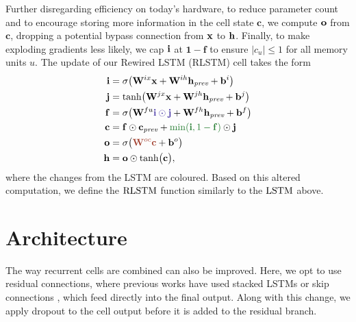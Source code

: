 Further disregarding efficiency on today's hardware, to reduce parameter count and to encourage storing more information in the cell state $\mathbf{c}$, we compute $\mathbf{o}$ from $\mathbf{c}$, dropping a potential bypass connection from $\mathbf{x}$ to $\mathbf{h}$.
Finally, to make exploding gradients less likely, we cap $\mathbf{i}$ at $\mathbf{1-f}$ to ensure $|c_u| \leqslant 1$ for all memory units $u$.
The update of our Rewired LSTM (RLSTM) cell takes the form
{\setlength{\jot}{0.5em}
\begin{align*}
  \vi &= \sigma\bigl(\mW^{ix} \vx + \mW^{ih} \vhprev + \vb^i\bigr) \\
  \vj &= \tanh\bigl(\mW^{jx}\vx + \mW^{jh} \vhprev + \vb^j\bigr) \\
  \vf &= \sigma\bigl(\mW^{fu} \textcolor{mglblue}{\vi\odot \vj} + \mW^{fh} \vhprev + \vb^f\bigr) \\
  \vc &= \vf \odot \vcprev + \textcolor{mglgreen}{\min(\vi, 1-\vf)} \odot \vj \\
  \vo &= \sigma\bigl(\textcolor{mglred}{\mW^{oc} \vc} + \vb^o\bigr) \\
  \vh &= \vo \odot \tanh\bigl(\vc\bigr),
\end{align*}}%
where the changes from the LSTM are coloured.
Based on this altered computation, we define the $\operatorname*{RLSTM}$ function similarly to the $\operatorname*{LSTM}$ above.

\section{Architecture}
\label{sec:architecture}

The way recurrent cells are combined can also be improved.
Here, we opt to use residual connections, where previous works have used stacked LSTMs \citep{merity2017regularizing} or skip connections \citep{melis2019mogrifier}, which feed directly into the final output.
Along with this change, we apply dropout \citep{hinton2012improving} to the cell output before it is added to the residual branch.


